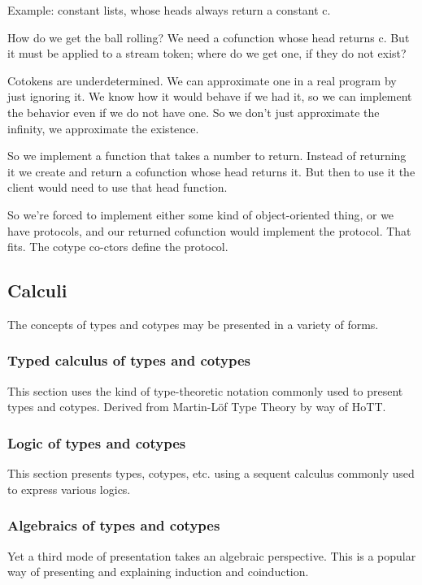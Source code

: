 \documentclass{article}
\begin{document}
Example: constant lists, whose heads always return a constant c.

How do we get the ball rolling? We need a cofunction whose head
returns c. But it must be applied to a stream token; where do we get
one, if they do not exist?

Cotokens are underdetermined. We can approximate one in a real program
by just ignoring it. We know how it would behave if we had it, so we
can implement the behavior even if we do not have one.  So we don't just approximate the infinity, we approximate the existence.

So we implement a  function that takes a number to
return. Instead of returning it we create and return a cofunction
whose head returns it. But then to use it the client would need to use
that head function.

So we're forced to implement either some kind of object-oriented
thing, or we have protocols, and our returned cofunction would
implement the protocol. That fits. The cotype co-ctors define the
protocol.


\subsection{Calculi}
The concepts of types and cotypes may be presented in a variety of forms.

\subsubsection{Typed calculus of types and cotypes}

This section uses the kind of type-theoretic notation commonly used to
present types and cotypes. Derived from Martin-Löf Type Theory by way
of HoTT.

\subsubsection{Logic of types and cotypes}

This section presents types, cotypes, etc. using a sequent calculus
commonly used to express various logics.

\subsubsection{Algebraics of types and cotypes}

Yet a third mode of presentation takes an algebraic perspective. This
is a popular way of presenting and explaining induction and
coinduction.
\end{document}
